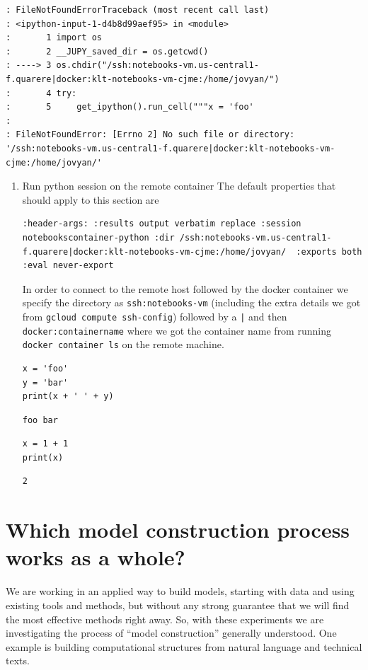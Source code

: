 \documentclass[11pt]{article}
\begin{document}
\begin{verbatim}
: FileNotFoundErrorTraceback (most recent call last)
: <ipython-input-1-d4b8d99aef95> in <module>
:       1 import os
:       2 __JUPY_saved_dir = os.getcwd()
: ----> 3 os.chdir("/ssh:notebooks-vm.us-central1-f.quarere|docker:klt-notebooks-vm-cjme:/home/jovyan/")
:       4 try:
:       5     get_ipython().run_cell("""x = 'foo'
:
: FileNotFoundError: [Errno 2] No such file or directory: '/ssh:notebooks-vm.us-central1-f.quarere|docker:klt-notebooks-vm-cjme:/home/jovyan/'
\end{verbatim}

\begin{enumerate}
\item Run python session on the remote container
\label{sec:org73238d6}
The default properties that should apply to this section are

\begin{verbatim}
:header-args: :results output verbatim replace :session notebookscontainer-python :dir /ssh:notebooks-vm.us-central1-f.quarere|docker:klt-notebooks-vm-cjme:/home/jovyan/  :exports both  :eval never-export
\end{verbatim}

In order to connect to the remote host followed by the docker container we specify the directory as \texttt{ssh:notebooks-vm} (including the extra details we got from \texttt{gcloud compute ssh-config}) followed by a \texttt{|} and then \texttt{docker:containername} where we got the container name from running \texttt{docker container ls} on the remote machine.

\begin{verbatim}
x = 'foo'
y = 'bar'
print(x + ' ' + y)
\end{verbatim}

\begin{verbatim}
foo bar
\end{verbatim}


\begin{verbatim}
x = 1 + 1
print(x)
\end{verbatim}

\begin{verbatim}
2
\end{verbatim}
\end{enumerate}
\section{Which model construction process works as a whole?}
\label{sec:orgdf6f8e3}
We are working in an applied way to build models, starting with data
and using existing tools and methods, but without any strong guarantee
that we will find the most effective methods right away. So, with
these experiments we are investigating the process of “model
construction” generally understood. One example is building
computational structures from natural language and technical texts.
\end{document}
